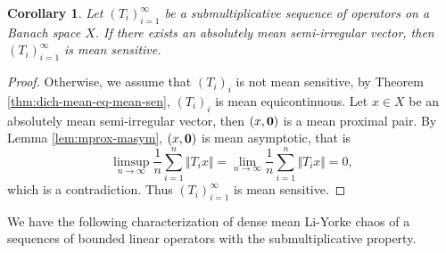 \documentclass[12pt,a4paper]{amsart}
\theoremstyle{definition}
\theoremstyle{plain}
\newtheorem{coro}[defn]{Corollary}
\begin{document}
\begin{coro}
    Let $(T_i)_{i=1}^\infty$ be a submultiplicative sequence of operators on a Banach space $X$.
    If there exists an absolutely mean semi-irregular vector, then $(T_i)_{i=1}^\infty$ is mean sensitive.
\end{coro}
\begin{proof}
    Otherwise, we assume that $(T_i)_{i}$ is not mean sensitive, by Theorem \ref{thm:dich-mean-eq-mean-sen}, $(T_i)_{i}$ is mean equicontinuous.
    Let $x \in X$ be an absolutely mean semi-irregular vector, then $(x,{\bf 0})$ is a mean proximal pair.
    By Lemma \ref{lem:mprox-masym}, $(x,{\bf 0})$ is mean asymptotic, that is
    \[
        \limsup_{n\to \infty}\frac{1}{n}\sum_{i=1}^n \Vert T_ix \Vert =\lim_{n\to \infty}\frac{1}{n}\sum_{i=1}^n \Vert T_ix \Vert =0,
    \]
    which is a contradiction.
    Thus $(T_i)_{i=1}^\infty$ is mean sensitive.
\end{proof}

We have the following characterization of  dense mean Li-Yorke chaos of a sequences of bounded linear operators with the submultiplicative property.
\end{document}
